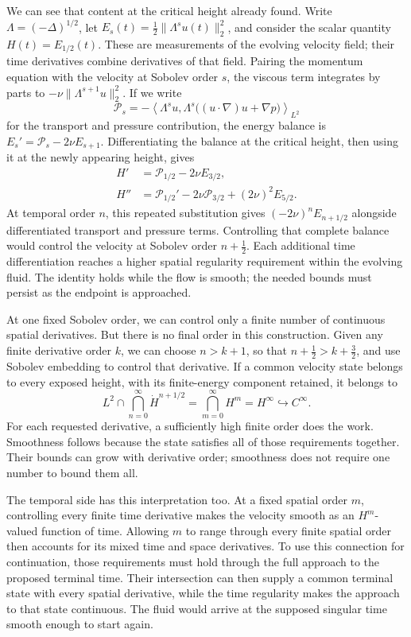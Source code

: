 We can see that content at the critical height already found. Write
\(\Lambda=(-\Delta)^{1/2}\), let
\(E_s(t)=\tfrac12\|\Lambda^su(t)\|_2^2\), and consider the scalar quantity
\(H(t)=E_{1/2}(t)\). These are measurements of the evolving velocity field;
their time derivatives combine derivatives of that field. Pairing the
momentum equation with the velocity at Sobolev order \(s\), the viscous term
integrates by parts to \(-\nu\|\Lambda^{s+1}u\|_2^2\). If we write
\[
 \mathcal P_s
 =-\left\langle\Lambda^su,
   \Lambda^s\bigl((u\!\cdot\nabla)u+\nabla p\bigr)\right\rangle_{L^2}
\]
for the transport and pressure contribution, the energy balance is
\(E_s'=\mathcal P_s-2\nu E_{s+1}\). Differentiating the balance at the
critical height, then using it at the newly appearing height, gives
\[
 \begin{aligned}
 H'&=\mathcal P_{1/2}-2\nu E_{3/2},\\
 H''&=\mathcal P_{1/2}'-2\nu\mathcal P_{3/2}
                  +(2\nu)^2E_{5/2}.
 \end{aligned}
\]
At temporal order \(n\), this repeated substitution gives
\((-2\nu)^nE_{n+1/2}\) alongside differentiated transport and pressure terms.
Controlling that complete balance would control the velocity at Sobolev order
\(n+\tfrac12\). Each additional time differentiation reaches a higher spatial
regularity requirement within the evolving fluid. The identity holds while
the flow is smooth; the needed bounds must persist as the endpoint is
approached.

At one fixed Sobolev order, we can control only a finite number of continuous
spatial derivatives. But there is no final order in this construction. Given
any finite derivative order \(k\), we can choose \(n>k+1\), so that
\(n+\tfrac12>k+\tfrac32\), and use Sobolev embedding to control that derivative.
If a common velocity state belongs to every exposed height, with its
finite-energy component retained, it belongs to
\[
 L^2\cap\bigcap_{n=0}^{\infty}\dot H^{n+1/2}
 =\bigcap_{m=0}^{\infty}H^m
 =H^\infty
 \hookrightarrow C^\infty.
\]
For each requested derivative, a sufficiently high finite order does the
work. Smoothness follows because the state satisfies all of those
requirements together. Their bounds can grow with derivative order; smoothness
does not require one number to bound them all.

The temporal side has this interpretation too. At a fixed spatial order
\(m\), controlling every finite time derivative makes the velocity smooth as
an \(H^m\)-valued function of time. Allowing \(m\) to range through every
finite spatial order then accounts for its mixed time and space derivatives.
To use this connection for
continuation, those requirements must hold through the full approach to the
proposed terminal time. Their intersection can then supply a common terminal
state with every spatial derivative, while the time regularity makes the
approach to that state continuous. The fluid would arrive at the supposed
singular time smooth enough to start again.

